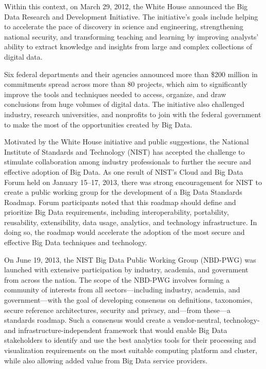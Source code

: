 Within this context, on March 29, 2012, the White House announced the
Big Data Research and Development Initiative. The initiative's goals
include helping to accelerate the pace of discovery in science and
engineering, strengthening national security, and transforming
teaching and learning by improving analysts' ability to extract
knowledge and insights from large and complex collections of digital
data.

Six federal departments and their agencies announced more than \$200
million in commitments spread across more than 80 projects, which aim
to significantly improve the tools and techniques needed to access,
organize, and draw conclusions from huge volumes of digital data. The
initiative also challenged industry, research universities, and
nonprofits to join with the federal government to make the most of the
opportunities created by Big Data.

Motivated by the White House initiative and public suggestions, the
National Institute of Standards and Technology (NIST) has accepted the
challenge to stimulate collaboration among industry professionals to
further the secure and effective adoption of Big Data. As one result
of NIST's Cloud and Big Data Forum held on January 15–17, 2013, there
was strong encouragement for NIST to create a public working group for
the development of a Big Data Standards Roadmap. Forum participants
noted that this roadmap should define and prioritize Big Data
requirements, including interoperability, portability, reusability,
extensibility, data usage, analytics, and technology infrastructure.
In doing so, the roadmap would accelerate the adoption of the most
secure and effective Big Data techniques and technology.

On June 19, 2013, the NIST Big Data Public Working Group (NBD-PWG) was
launched with extensive participation by industry, academia, and
government from across the nation. The scope of the NBD-PWG involves
forming a community of interests from all sectors—including industry,
academia, and government—with the goal of developing consensus on
definitions, taxonomies, secure reference architectures, security and
privacy, and—from these—a standards roadmap. Such a consensus would
create a vendor-neutral, technology- and infrastructure-independent
framework that would enable Big Data stakeholders to identify and use
the best analytics tools for their processing and visualization
requirements on the most suitable computing platform and cluster,
while also allowing added value from Big Data service providers.

